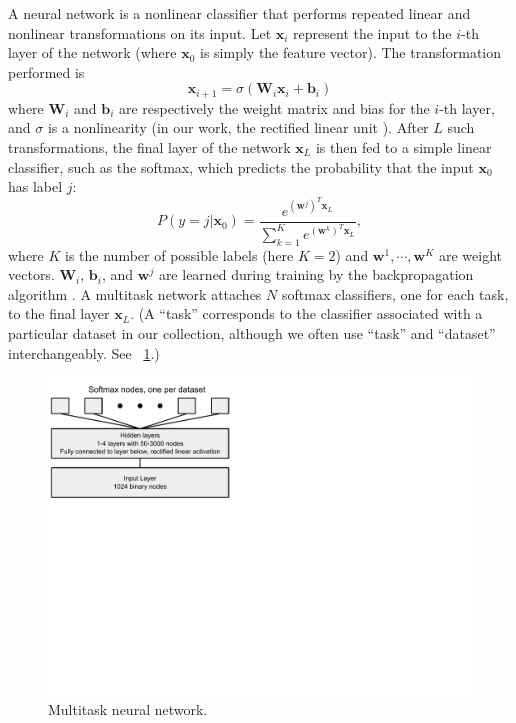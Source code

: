 A neural network is a nonlinear classifier that performs repeated linear
and nonlinear transformations on its input. Let $\mathbf{x}_i$ represent
the input to the $i$-th layer of the network (where $\mathbf{x}_0$ is
simply the feature vector). The transformation performed is
\[
\mathbf{x}_{i+1} = \sigma(\mathbf{W}_{i} \mathbf{x}_i + \mathbf{b}_{i})
\]
where $\mathbf{W}_i$ and $\mathbf{b}_i$ are respectively the weight matrix
and bias for the $i$-th layer, and $\sigma$ is a nonlinearity (in our work,
the rectified linear unit \cite{nair2010rectified}). After $L$ such
transformations, the final layer of the network $\mathbf{x}_L$ is then fed
to a simple linear classifier, such as the softmax, which predicts the
probability that the input $\mathbf{x}_0$ has label $j$:
\[
P(y = j | \mathbf{x}_0 ) = \frac{e^{(\mathbf{w}^j)^T \mathbf{x}_L}}{\sum_{k=1}^K e^{(\mathbf{w}^k)^T \mathbf{x}_L}},
\]
where $K$ is the number of possible labels (here $K = 2$) and
$\mathbf{w}^{1}, \cdots, \mathbf{w}^{K}$ are weight vectors.
$\mathbf{W}_i$, $\mathbf{b}_i$, and $\mathbf{w}^j$ are learned during
training by the backpropagation algorithm \cite{rumelhart1988learning}.  A
multitask network attaches $N$ softmax classifiers, one for each task, to
the final layer $\mathbf{x}_L$. (A ``task'' corresponds to the classifier
associated with a particular dataset in our collection, although we often
use ``task'' and ``dataset'' interchangeably. See
\figurename~\ref{fig:network}.)

\begin{figure}[ht]
\centering
\includegraphics[trim=0 4.5in 5.5in 0,clip,width=0.9\linewidth]{Images/network.pdf}
\caption{Multitask neural network.}
\label{fig:network}
\end{figure}

